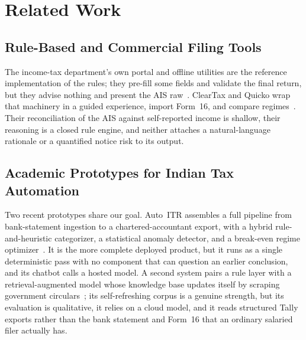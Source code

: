 \documentclass[conference]{IEEEtran}
\begin{document}
\section{Related Work}
\subsection{Rule-Based and Commercial Filing Tools}
The income-tax department's own portal and offline utilities are the reference
implementation of the rules; they pre-fill some fields and validate the final
return, but they advise nothing and present the AIS raw~\cite{ref_portal}.
ClearTax and Quicko wrap that machinery in a guided experience, import Form~16,
and compare regimes~\cite{ref_cleartax,ref_quicko}. Their reconciliation of the
AIS against self-reported income is shallow, their reasoning is a closed rule
engine, and neither attaches a natural-language rationale or a quantified notice
risk to its output.

\subsection{Academic Prototypes for Indian Tax Automation}
Two recent prototypes share our goal. Auto~ITR assembles a full pipeline from
bank-statement ingestion to a chartered-accountant export, with a hybrid
rule-and-heuristic categorizer, a statistical anomaly detector, and a
break-even regime optimizer~\cite{ref_autoitr}. It is the more complete deployed
product, but it runs as a single deterministic pass with no component that can
question an earlier conclusion, and its chatbot calls a hosted model. A second
system pairs a rule layer with a retrieval-augmented model whose knowledge base
updates itself by scraping government circulars~\cite{ref_selfrag}; its
self-refreshing corpus is a genuine strength, but its evaluation is qualitative,
it relies on a cloud model, and it reads structured Tally exports rather than the
bank statement and Form~16 that an ordinary salaried filer actually has.
\end{document}
